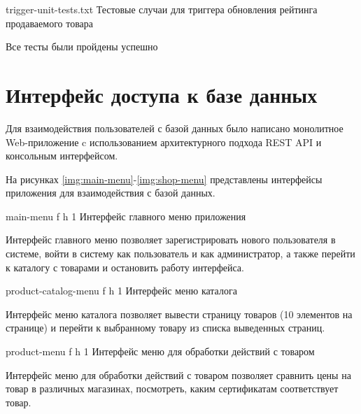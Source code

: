 {trigger-unit-tests.txt} %
{Тестовые случаи для триггера обновления рейтинга продаваемого товара} %

Все тесты были пройдены успешно

\section{Интерфейс доступа к базе данных}

Для взаимодействия пользователей с базой данных было написано монолитное Web-приложение c использованием архитектурного подхода REST API \cite{info_rest_api} и консольным интерфейсом.

На рисунках \ref{img:main-menu}-\ref{img:shop-menu} представлены интерфейсы приложения для взаимодействия с базой данных.

{main-menu} %
{f} %
{h} %
{1\textwidth} %
{Интерфейс главного меню приложения} %

Интерфейс главного меню позволяет зарегистрировать нового пользователя в системе, войти в систему как пользователь и как администратор, а также перейти к каталогу с товарами и остановить работу интерфейса.

{product-catalog-menu} %
{f} %
{h} %
{1\textwidth} %
{Интерфейс меню каталога} %

Интерфейс меню каталога позволяет вывести страницу товаров (10 элементов на странице) и перейти к выбранному товару из списка выведенных страниц.

\clearpage

{product-menu} %
{f} %
{h} %
{1\textwidth} %
{Интерфейс меню для обработки действий с товаром} %

Интерфейс меню для обработки действий с товаром позволяет сравнить цены на товар в  различных магазинах, посмотреть, каким сертификатам соответствует товар.

